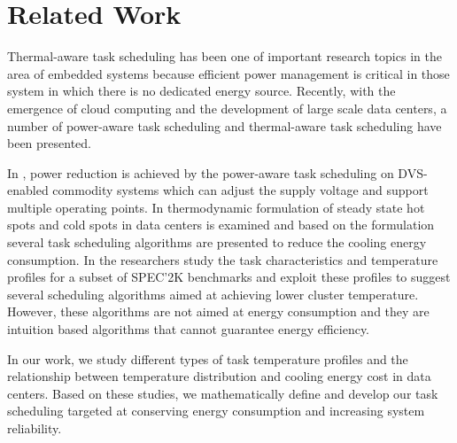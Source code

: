 

\section{Related Work}

Thermal-aware task scheduling \cite{DBLP:conf/dac/MukherjeeMM05, DBLP:conf/iccad/JayaseelanM08,DBLP:conf/date/CoskunRW07,DBLP:conf/vlsid/JayaseelanM09,arani2007ota,DBLP:conf/ispass/YangZCZJ08} has been one of important research topics in the area of embedded systems because efficient power management is critical in those system in which there is no dedicated energy source.
Recently, with the emergence of cloud computing and the development of large scale data centers, a number of power-aware task scheduling \cite{DBLP:conf/ccgrid/KimBK07,DBLP:conf/sc/GeFC05} and thermal-aware task scheduling \cite{DBLP:conf/cluster/TangGV07,DBLP:conf/usenix/MooreCRS05,DBLP:conf/aPcsac/VandersterBD07} have been presented.

In \cite{DBLP:conf/ccgrid/KimBK07,DBLP:conf/sc/GeFC05},  power reduction is achieved by the power-aware task scheduling on DVS-enabled commodity systems which can adjust the supply voltage and support multiple operating points. In \cite{DBLP:conf/cluster/TangGV07,DBLP:conf/usenix/MooreCRS05} thermodynamic formulation of steady state hot spots and cold spots in data centers is examined and based on the formulation several task scheduling algorithms are presented to reduce the cooling energy consumption. In \cite{DBLP:conf/aPcsac/VandersterBD07} the researchers study the task characteristics and temperature profiles for a subset of SPEC'2K benchmarks and exploit these profiles to suggest several scheduling algorithms aimed at achieving lower cluster temperature. However, these algorithms are not aimed at energy consumption and they are intuition based algorithms that cannot guarantee energy efficiency. 

In our work, we study different types of task temperature profiles and the relationship between temperature distribution and cooling energy cost in data centers. Based on these studies, we mathematically define and develop our task scheduling targeted at conserving energy consumption and increasing system reliability.
 
